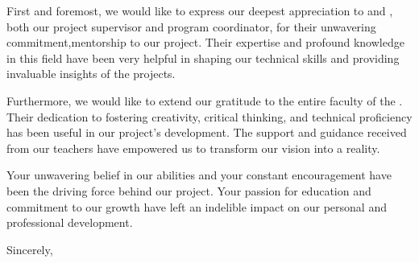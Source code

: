 First and foremost, we would like to express our deepest appreciation to \thesupervisor and \theprogramcoordinator, both our project supervisor and program coordinator, for their unwavering commitment,mentorship to our project. Their expertise and profound knowledge in this field have been very helpful in shaping our technical skills and providing invaluable insights of the projects.

Furthermore, we would like to extend our gratitude to the entire faculty of the \thedepartment. Their dedication to fostering creativity, critical thinking, and technical proficiency has been useful in our project's development. The support and guidance received from our teachers have empowered us to transform our vision into a reality.

Your unwavering belief in our abilities and your constant encouragement have been the driving force behind our project. Your passion for education and commitment to our growth have left an indelible impact on our personal and professional development.


Sincerely,\\
\theauthor\\
\thedepartment\\
\thecampus\\
\newpage